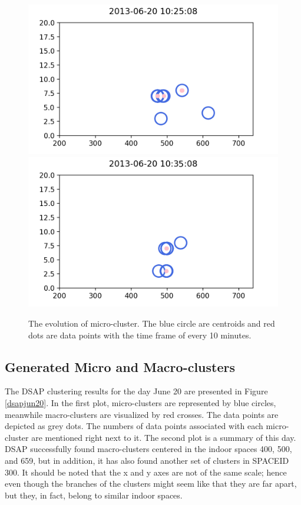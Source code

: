 \begin{figure}[!ht]
        \includegraphics[width = 5 cm]{image/Chapters/Chapter6/value327.png}\hfill
        \includegraphics[width = 5 cm]{image/Chapters/Chapter6/value343.png}\hfill
    \caption{The evolution of micro-cluster. The blue circle are centroids and red dots are data points with the time frame of every 10 minutes. }
    \label{drift}
\end{figure}



\subsection{Generated Micro and Macro-clusters}




The DSAP clustering results for the day June 20 are presented in Figure \ref{dsapjun20}. In the first plot, micro-clusters are represented by blue circles, meanwhile macro-clusters are visualized by red crosses. The data points are depicted as grey dots. The numbers of data points associated with each micro-cluster are mentioned right next to it. The second plot is a summary of this day. DSAP successfully found macro-clusters centered in the indoor spaces 400, 500, and 659, but in addition, it has also found another set of clusters in SPACEID 300. It should be noted that the x and y axes are not of the same scale; hence even though the branches of the clusters might seem like that they are far apart, but they, in fact, belong to similar indoor spaces.


 
